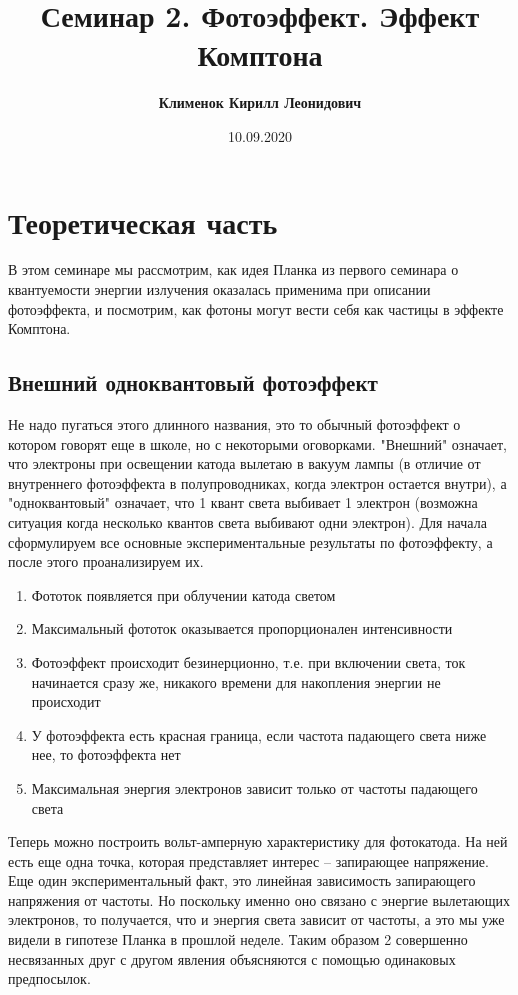 \documentclass[12pt]{article}
\begin{document}
 
\title{\textbf{Семинар 2. Фотоэффект. Эффект Комптона}}
\author{\textbf{Клименок Кирилл Леонидович}}
\date{10.09.2020}
\maketitle
\section{Теоретическая часть}
В этом семинаре мы рассмотрим, как идея Планка из первого семинара о квантуемости энергии излучения оказалась применима при описании фотоэффекта, и посмотрим, как фотоны могут вести себя как частицы в эффекте Комптона.
\subsection{Внешний одноквантовый фотоэффект}
Не надо пугаться этого длинного названия, это то обычный фотоэффект о котором говорят еще в школе, но с некоторыми оговорками. "Внешний" означает, что электроны при освещении катода вылетаю в вакуум лампы (в отличие от внутреннего фотоэффекта в полупроводниках, когда электрон остается внутри), а "одноквантовый" означает, что 1 квант света выбивает 1 электрон (возможна ситуация когда несколько квантов света выбивают одни электрон). Для начала сформулируем все основные экспериментальные результаты по фотоэффекту, а после этого проанализируем их.
\begin{enumerate}
    \item Фототок появляется при облучении катода светом
    \item Максимальный фототок оказывается пропорционален интенсивности
    \item Фотоэффект происходит безинерционно, т.е. при включении света, ток начинается сразу же, никакого времени для накопления энергии не происходит
    \item У фотоэффекта есть красная граница, если частота падающего света ниже нее, то фотоэффекта нет
    \item Максимальная энергия электронов зависит только от частоты падающего света
\end{enumerate}
Теперь можно построить вольт-амперную характеристику для фотокатода. На ней есть еще одна точка, которая представляет интерес -- запирающее напряжение. Еще один экспериментальный факт, это линейная зависимость запирающего напряжения от частоты. Но поскольку именно оно связано с энергие вылетающих электронов, то получается, что и энергия света зависит от частоты, а это мы уже видели в гипотезе Планка в прошлой неделе. Таким образом 2 совершенно несвязанных друг с другом явления объясняются с помощью одинаковых предпосылок.
\end{document}
